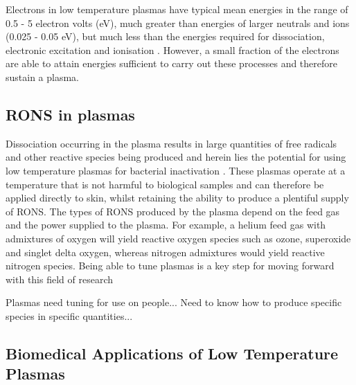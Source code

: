 \documentclass[11pt, oneside]{article}   	%
\begin{document}
Electrons in low temperature plasmas have typical mean energies in the range of 0.5 - 5 electron volts (eV), much greater than energies of larger neutrals and ions (0.025 - 0.05 eV), but much less than the energies required for dissociation, electronic excitation and ionisation \cite{Christophorou2012}.
However, a small fraction of the electrons are able to attain energies sufficient to carry out these processes and therefore sustain a plasma.

\subsection{RONS in plasmas}

Dissociation occurring in the plasma results in large quantities of free radicals and other reactive species being produced and herein lies the potential for using low temperature plasmas for bacterial inactivation \cite{Graves2012}.
These plasmas operate at a temperature that is not harmful to biological samples and can therefore be applied directly to skin, whilst retaining the ability to produce a plentiful supply of RONS. 
The types of RONS produced by the plasma depend on the feed gas and the power supplied to the plasma.
For example, a helium feed gas with admixtures of oxygen will yield reactive oxygen species such as ozone, superoxide and singlet delta oxygen, whereas nitrogen admixtures would yield reactive nitrogen species. 
Being able to tune plasmas is a key step for moving forward with this field of research 

Plasmas need tuning for use on people... Need to know how to produce specific species in specific quantities...


\subsection{Biomedical Applications of Low Temperature Plasmas}
\end{document}
